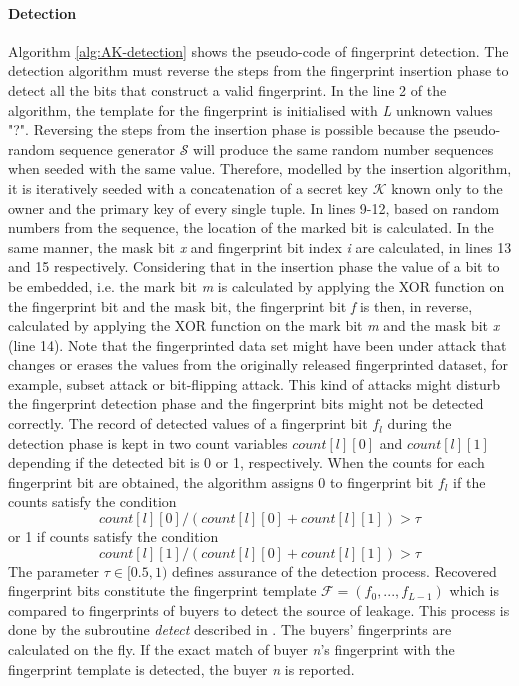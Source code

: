 \paragraph{Detection}
Algorithm \ref{alg:AK-detection} shows the pseudo-code of fingerprint detection. 
The detection algorithm must reverse the steps from the fingerprint insertion phase to detect all the bits that construct a valid fingerprint. 
In the line 2 of the algorithm, the template for the fingerprint is initialised with \textit{L} unknown values "?".
Reversing the steps from the insertion phase is possible because the pseudo-random sequence generator $\mathcal{S}$ will produce the same random number sequences when seeded with the same value.
Therefore, modelled by the insertion algorithm, it is iteratively seeded with a concatenation of a secret key $\mathcal{K}$ known only to the owner and the primary key of every single tuple.
In lines 9-12, based on random numbers from the sequence, the location of the marked bit is calculated.
In the same manner, the mask bit \textit{x} and fingerprint bit index \textit{i} are calculated, in lines 13 and 15 respectively.
Considering that in the insertion phase the value of a bit to be embedded, i.e. the mark bit \textit{m} is calculated by applying the XOR function on the fingerprint bit and the mask bit, the fingerprint bit \textit{f} is then, in reverse, calculated by applying the XOR function on the mark bit \textit{m} and the mask bit \textit{x} (line 14).
Note that the fingerprinted data set might have been under attack that changes or erases the values from the originally released fingerprinted dataset, for example, subset attack or bit-flipping attack.
This kind of attacks might disturb the fingerprint detection phase and the fingerprint bits might not be detected correctly.
The record of detected values of a fingerprint bit $f_l$ during the detection phase is kept in two count variables $count[l][0]$ and $count[l][1]$ depending if the detected bit is 0 or 1, respectively. 
When the counts for each fingerprint bit are obtained, the algorithm assigns 0 to fingerprint bit $f_l$ if the counts satisfy the condition
\begin{equation}
    count[l][0]/(count[l][0]+count[l][1])>\tau
\end{equation}
or 1 if counts satisfy the condition
\begin{equation}
    count[l][1]/(count[l][0]+count[l][1])>\tau
\end{equation}
The parameter $\tau \in [0.5, 1)$ defines assurance of the detection process.
Recovered fingerprint bits constitute the fingerprint template $\mathcal{F}=(f_0,...,f_{L-1})$ which is compared to fingerprints of buyers to detect the source of leakage. 
This process is done by the subroutine \textit{detect} described in .
The buyers' fingerprints are calculated on the fly.
If the exact match of buyer \textit{n}'s fingerprint with the fingerprint template is detected, the buyer \textit{n} is reported.


